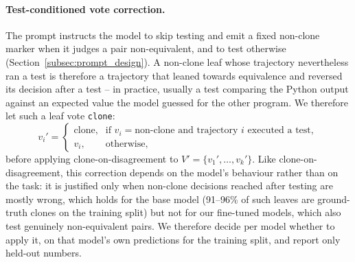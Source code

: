 \paragraph{Test-conditioned vote correction.} The prompt instructs the model
to skip testing and emit a fixed non-clone marker when it judges a pair
non-equivalent, and to test otherwise (Section~\ref{subsec:prompt_design}).
A non-clone leaf whose trajectory nevertheless ran a test is therefore a
trajectory that leaned towards equivalence and reversed its decision after a
test -- in practice, usually a test comparing the Python output against an
expected value the model guessed for the other program. We therefore let
such a leaf vote \texttt{clone}:
\[
    v_i' =
    \begin{cases}
        \text{clone}, & \text{if } v_i = \text{non-clone} \text{ and trajectory } i \text{ executed a test}, \\
        v_i, & \text{otherwise},
    \end{cases}
\]
before applying clone-on-disagreement to $V' = \{v_1', \ldots, v_k'\}$.
Like clone-on-disagreement, this correction depends on the model's
behaviour rather than on the task: it is justified only when non-clone
decisions reached after testing are mostly wrong, which holds for the base
model (91--96\% of such leaves are ground-truth clones on the training split)
but not for our fine-tuned models, which also test genuinely non-equivalent
pairs. We therefore decide per model whether to apply it, on that model's own
predictions for the training split, and report only held-out numbers.


